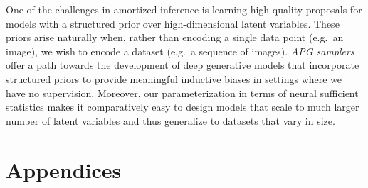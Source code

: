 \documentclass[anonymous=false, %
               format=acmsmall, %
               review=true, %
               screen=true, %
               nonacm=true]{acmart}
\theoremstyle{definition}
\begin{document}
One of the challenges in amortized inference is learning high-quality proposals for models with a structured prior over high-dimensional latent variables. These priors arise naturally when, rather than encoding a single data point (e.g.~an image), we wish to encode a dataset (e.g.~a sequence of images). 
\emph{APG samplers} offer a path towards the development of deep generative models that incorporate structured priors to provide meaningful inductive biases in settings where we have no supervision. 
Moreover, our parameterization in terms of neural sufficient statistics makes it comparatively easy to design models that scale to much larger number of latent variables and thus generalize to datasets that vary in size. 






\newpage
\section{Appendices}
\end{document}
